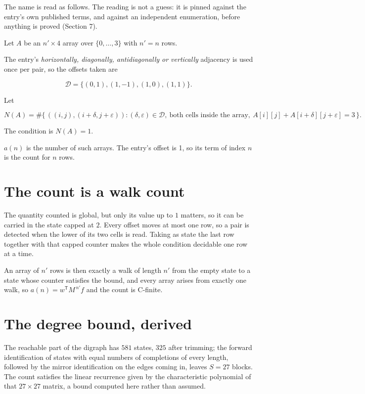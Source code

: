 \documentclass[11pt]{article}
\theoremstyle{definition}
\begin{document}
The name is read as follows. The reading is not a guess: it is pinned against the entry's own published terms, and against an independent enumeration, before anything is proved (Section 7).

Let $A$ be an $n' \times 4$ array over $\{0,\dots,3\}$ with $n' = n$ rows.

The entry's {\itshape horizontally, diagonally, antidiagonally or vertically} adjacency is used once per pair, so the offsets taken are

\[\mathcal{D} = \{(0,1), (1,-1), (1,0), (1,1)\}.\]

Let

\[N(A) = \#\bigl\{\,((i,j),(i{+}\delta,j{+}\varepsilon)) : (\delta,\varepsilon) \in \mathcal{D},\ \text{both cells inside the array},\ A[i][j] + A[i{+}\delta][j{+}\varepsilon] = 3\,\bigr\}.\]

The condition is $N(A) = 1$.

$a(n)$ is the number of such arrays. The entry's offset is 1, so its term of index $n$ is the count for $n$ rows.

\section{The count is a walk count}

The quantity counted is global, but only its value up to $1$ matters, so it can be carried in the state capped at $2$. Every offset moves at most one row, so a pair is detected when the lower of its two cells is read. Taking as state the last row together with that capped counter makes the whole condition decidable one row at a time.

An array of $n'$ rows is then exactly a walk of length $n'$ from the empty state to a state whose counter satisfies the bound, and every array arises from exactly one walk, so $a(n) = w^{\mathsf T}M^{\,n'}f$ and the count is C-finite.

\section{The degree bound, derived}

The reachable part of the digraph has $581$ states, $325$ after trimming; the forward identification of states with equal numbers of completions of every length, followed by the mirror identification on the edges coming in, leaves $S = 27$ blocks. The count satisfies the linear recurrence given by the characteristic polynomial of that $27\times27$ matrix, a bound computed here rather than assumed.
\end{document}
